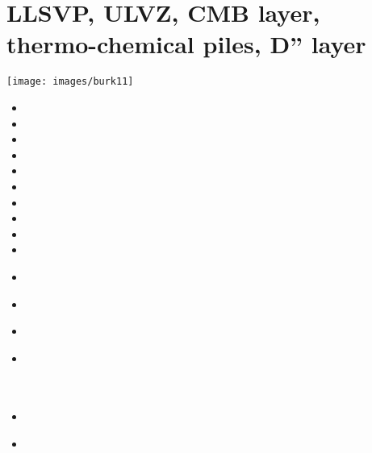 \section{LLSVP, ULVZ, CMB layer, thermo-chemical piles, D'' layer}

\begin{center}
\texttt{[image: images/burk11]}\cite{burk11}
\end{center}

\begin{small}
\begin{itemize}
\item[\nineteeneighty]       
\item[\nineteeneightysix]    
\item[\nineteeneightyeight]  
\item[\nineteeneightynine]   
\item[\nineteenninetyfour]   
\item[\nineteenninetysix]    
\item[\nineteenninetyseven]  
\item[\nineteenninetyeight]  
\item[\twothousand]
\item[\twothousandone]       
\item[\twothousandtwo]       
 \\
\item[\twothousandthree]
\item[\twothousandfour]      
 \\
\item[\twothousandfive]      
 \\
 \\
 \\
\item[\twothousandsix]       
\item[\twothousandseven]     
\\

\end{itemize}
\end{small}
